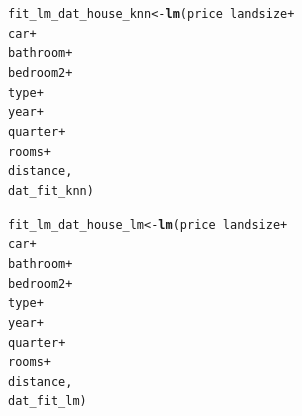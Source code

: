 \documentclass{article}\usepackage[]{graphicx}\usepackage[]{xcolor}
\makeatletter
\newcommand{\hlopt}[1]{\textcolor[rgb]{0,0,0}{#1}}%
\newcommand{\hlstd}[1]{\textcolor[rgb]{0.345,0.345,0.345}{#1}}%
\newcommand{\hlkwb}[1]{\textcolor[rgb]{0.69,0.353,0.396}{#1}}%
\newcommand{\hlkwd}[1]{\textcolor[rgb]{0.737,0.353,0.396}{\textbf{#1}}}%
\newenvironment{kframe}{%
 \def\at@end@of@kframe{}%
 \ifinner\ifhmode%
  \def\at@end@of@kframe{\end{minipage}}%
  \begin{minipage}{\columnwidth}%
 \fi\fi%
 \def\FrameCommand##1{\hskip\@totalleftmargin \hskip-\fboxsep
 \colorbox{shadecolor}{##1}\hskip-\fboxsep
     \hskip-\linewidth \hskip-\@totalleftmargin \hskip\columnwidth}%
 \MakeFramed {\advance\hsize-\width
   \@totalleftmargin\z@ \linewidth\hsize
   \@setminipage}}%
 {\par\unskip\endMakeFramed%
 \at@end@of@kframe}
\newenvironment{knitrout}{}{} %
\makeatother
\begin{document}
\begin{knitrout}
\begin{kframe}
\begin{alltt}
\hlstd{fit_lm_dat_house_knn} \hlkwb{<-} \hlkwd{lm}\hlstd{(price} \hlopt{~} \hlstd{landsize} \hlopt{+}
                            \hlstd{car} \hlopt{+}
                            \hlstd{bathroom} \hlopt{+}
                            \hlstd{bedroom2} \hlopt{+}
                            \hlstd{type} \hlopt{+}
                            \hlstd{year} \hlopt{+}
                            \hlstd{quarter} \hlopt{+}
                            \hlstd{rooms} \hlopt{+}
                            \hlstd{distance,}
                           \hlstd{dat_fit_knn)}

\hlstd{fit_lm_dat_house_lm} \hlkwb{<-} \hlkwd{lm}\hlstd{(price} \hlopt{~} \hlstd{landsize} \hlopt{+}
                            \hlstd{car} \hlopt{+}
                            \hlstd{bathroom} \hlopt{+}
                            \hlstd{bedroom2} \hlopt{+}
                            \hlstd{type} \hlopt{+}
                            \hlstd{year} \hlopt{+}
                            \hlstd{quarter} \hlopt{+}
                            \hlstd{rooms} \hlopt{+}
                            \hlstd{distance,}
                          \hlstd{dat_fit_lm)}
\end{alltt}
\end{kframe}
\end{knitrout}
\end{document}
